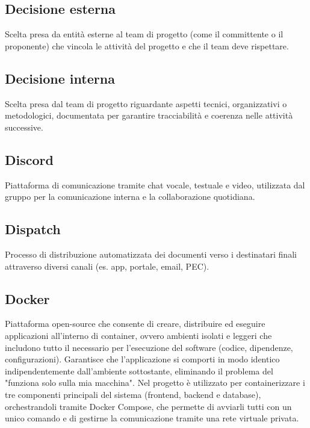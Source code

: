 \documentclass[a4paper,11pt]{article}
\begin{document}
\subsection{Decisione esterna}
Scelta presa da entità esterne al team di progetto (come il committente o il proponente) che vincola le attività del progetto e che il team deve rispettare.









\subsection{Decisione interna}
Scelta presa dal team di progetto riguardante aspetti tecnici, organizzativi o metodologici, documentata per garantire tracciabilità e coerenza nelle attività successive.









\subsection{Discord}
Piattaforma di comunicazione tramite chat vocale, testuale e video, utilizzata dal gruppo per la comunicazione interna e la collaborazione quotidiana.




\subsection{Dispatch}
Processo di distribuzione automatizzata dei documenti verso i destinatari finali attraverso diversi canali (es. app, portale, email, PEC).









\subsection{Docker}
Piattaforma open-source che consente di creare, distribuire ed eseguire applicazioni all'interno di container, ovvero ambienti isolati e leggeri che includono tutto il necessario per l'esecuzione del software (codice, dipendenze, configurazioni). Garantisce che l'applicazione si comporti in modo identico indipendentemente dall'ambiente sottostante, eliminando il problema del "funziona solo sulla mia macchina". Nel progetto è utilizzato per containerizzare i tre componenti principali del sistema (frontend, backend e database), orchestrandoli tramite Docker Compose, che permette di avviarli tutti con un unico comando e di gestirne la comunicazione tramite una rete virtuale privata.
\end{document}
